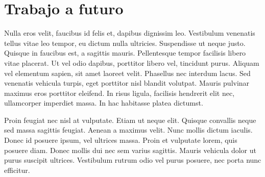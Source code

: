 \section{Trabajo a futuro}
\label{sec:futurework}

Nulla eros velit, faucibus id felis et, dapibus dignissim leo. Vestibulum venenatis tellus vitae leo tempor, eu dictum nulla ultricies. Suspendisse ut neque justo. Quisque in faucibus est, a sagittis mauris. Pellentesque tempor facilisis libero vitae placerat. Ut vel odio dapibus, porttitor libero vel, tincidunt purus. Aliquam vel elementum sapien, sit amet laoreet velit. Phasellus nec interdum lacus. Sed venenatis vehicula turpis, eget porttitor nisl blandit volutpat. Mauris pulvinar maximus eros porttitor eleifend. In risus ligula, facilisis hendrerit elit nec, ullamcorper imperdiet massa. In hac habitasse platea dictumst.

Proin feugiat nec nisl at vulputate. Etiam ut neque elit. Quisque convallis neque sed massa sagittis feugiat. Aenean a maximus velit. Nunc mollis dictum iaculis. Donec id posuere ipsum, vel ultrices massa. Proin et vulputate lorem, quis posuere diam. Donec mollis dui nec sem varius sagittis. Mauris vehicula dolor ut purus suscipit ultrices. Vestibulum rutrum odio vel purus posuere, nec porta nunc efficitur.